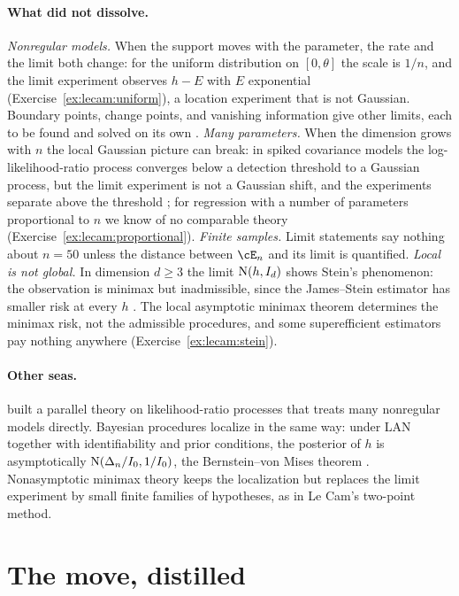 \begin{refsection}
\paragraph{What did not dissolve.}
\emph{Nonregular models.} When the support moves with the parameter, the rate and the limit both change: for the uniform distribution on $[0,\theta]$ the scale is $1/n$, and the limit experiment observes $h-E$ with $E$ exponential (Exercise~\ref{ex:lecam:uniform}), a location experiment that is not Gaussian. Boundary points, change points, and vanishing information give other limits, each to be found and solved on its own \parencite{IbragimovHasminskii1981}. \emph{Many parameters.} When the dimension grows with $n$ the local Gaussian picture can break: in spiked covariance models the log-likelihood-ratio process converges below a detection threshold to a Gaussian process, but the limit experiment is not a Gaussian shift, and the experiments separate above the threshold \parencite{OnatskiMoreiraHallin2013}; for regression with a number of parameters proportional to $n$ we know of no comparable theory (Exercise~\ref{ex:lecam:proportional}). \emph{Finite samples.} Limit statements say nothing about $n=50$ unless the distance between $\cE_n$ and its limit is quantified. \emph{Local is not global.} In dimension $d\ge3$ the limit $\mathrm{N}(h,I_d)$ shows Stein's phenomenon: the observation is minimax but inadmissible, since the James--Stein estimator has smaller risk at every $h$ \parencite{JamesStein1961}. The local asymptotic minimax theorem determines the minimax risk, not the admissible procedures, and some superefficient estimators pay nothing anywhere (Exercise~\ref{ex:lecam:stein}).

\paragraph{Other seas.}
\textcite{IbragimovHasminskii1981} built a parallel theory on likelihood-ratio processes that treats many nonregular models directly. Bayesian procedures localize in the same way: under LAN together with identifiability and prior conditions, the posterior of $h$ is asymptotically $\mathrm{N}(\Delta_n/I_0,1/I_0)$, the Bernstein--von Mises theorem \parencite[Chapter~10]{vanderVaart1998}. Nonasymptotic minimax theory keeps the localization but replaces the limit experiment by small finite families of hypotheses, as in Le Cam's two-point method.

\section{The move, distilled}\label{sec:lecam:distilled}


\end{refsection}
